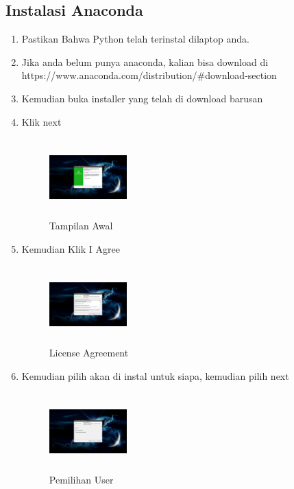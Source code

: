 \subsection{Instalasi Anaconda}
\begin{enumerate}
    \item Pastikan Bahwa Python telah terinstal dilaptop anda.
    \item Jika anda belum punya anaconda, kalian bisa download di https://www.anaconda.com/distribution/#download-section
    \item Kemudian buka installer yang telah di download barusan
    \item Klik next
    \begin{figure}[!htbp]
        \centering
        \includegraphics[width=3cm,height=3cm]{figures/Screenshot(80).png}
        \caption{Tampilan Awal}
        \label{awal}
        \end{figure}

    \item Kemudian Klik I Agree
    \begin{figure}[!htbp]
        \centering
        \includegraphics[width=3cm,height=3cm]{figures/Screenshot(81).png}
        \caption{License Agreement}
        \label{License}
        \end{figure}

    \item Kemudian pilih akan di instal untuk siapa, kemudian pilih next
    \begin{figure}[!htbp]
        \centering
        \includegraphics[width=3cm,height=3cm]{figures/Screenshot(82).png}
        \caption{Pemilihan User}
        \label{User}
        \end{figure}


\end{enumerate}
